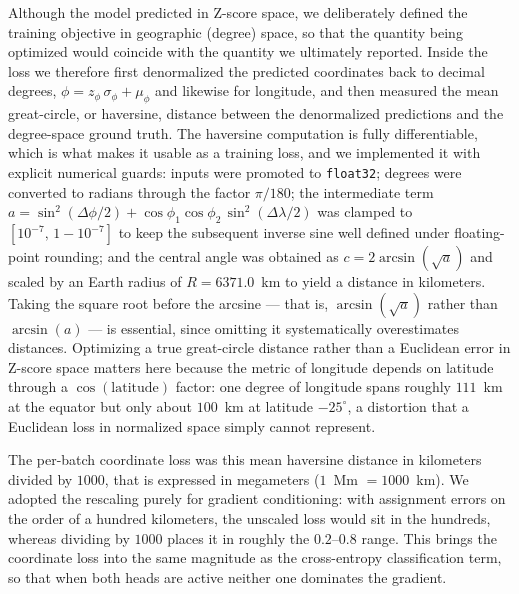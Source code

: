\documentclass[twocolumn,10pt]{article}
\begin{document}
Although the model predicted in Z-score space, we deliberately defined the training objective in
geographic (degree) space, so that the quantity being optimized would coincide with the quantity we
ultimately reported. Inside the loss we therefore first denormalized the predicted coordinates back
to decimal degrees, $\phi = z_{\phi}\,\sigma_{\phi} + \mu_{\phi}$ and likewise for longitude, and
then measured the mean great-circle, or haversine, distance between the denormalized predictions and
the degree-space ground truth. The haversine computation is fully differentiable, which is what
makes it usable as a training loss, and we implemented it with explicit numerical guards: inputs
were promoted to \texttt{float32}; degrees were converted to radians through the factor $\pi/180$;
the intermediate term $a = \sin^{2}(\Delta\phi/2) +
\cos\phi_{1}\cos\phi_{2}\,\sin^{2}(\Delta\lambda/2)$ was clamped to $[10^{-7},\, 1-10^{-7}]$ to keep
the subsequent inverse sine well defined under floating-point rounding; and the central angle was
obtained as $c = 2\arcsin(\sqrt{a})$ and scaled by an Earth radius of $R = 6371.0$~km to yield a
distance in kilometers. Taking the square root before the arcsine --- that is, $\arcsin(\sqrt{a})$
rather than $\arcsin(a)$ --- is essential, since omitting it systematically overestimates distances.
Optimizing a true great-circle distance rather than a Euclidean error in Z-score space matters here
because the metric of longitude depends on latitude through a $\cos(\text{latitude})$ factor: one
degree of longitude spans roughly $111$~km at the equator but only about $100$~km at latitude
$-25^{\circ}$, a distortion that a Euclidean loss in normalized space simply cannot represent.

The per-batch coordinate loss was this mean haversine distance in kilometers divided by $1000$, that
is expressed in megameters ($1$~Mm $= 1000$~km). We adopted the rescaling purely for gradient
conditioning: with assignment errors on the order of a hundred kilometers, the unscaled loss would
sit in the hundreds, whereas dividing by $1000$ places it in roughly the $0.2$--$0.8$ range. This
brings the coordinate loss into the same magnitude as the cross-entropy classification term, so that
when both heads are active neither one dominates the gradient.
\end{document}
